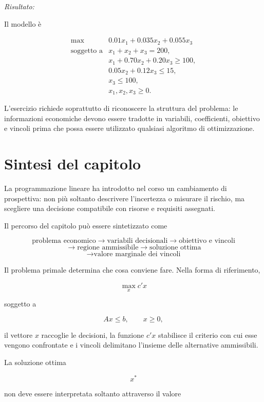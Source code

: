 \noindent
\textit{Risultato:}

Il modello \`e

\[
\begin{array}{ll}
\max
&
0.01x_1+0.035x_2+0.055x_3
\\[4pt]
\mbox{soggetto a}
&
x_1+x_2+x_3=200,
\\
&
x_1+0.70x_2+0.20x_3\geq100,
\\
&
0.05x_2+0.12x_3\leq15,
\\
&
x_3\leq100,
\\
&
x_1,x_2,x_3\geq0.
\end{array}
\]

L'esercizio richiede soprattutto di riconoscere la struttura del problema:
le informazioni economiche devono essere tradotte in variabili, coefficienti,
obiettivo e vincoli prima che possa essere utilizzato qualsiasi algoritmo di
ottimizzazione.

\section{Sintesi del capitolo}

\label{sec:cap11-sintesi}

La programmazione lineare ha introdotto nel corso un cambiamento di prospettiva:
non pi\`u soltanto descrivere l'incertezza o misurare il rischio, ma scegliere
una decisione compatibile con risorse e requisiti assegnati.

Il percorso del capitolo pu\`o essere sintetizzato come

\[
\text{problema economico}
\rightarrow
\text{variabili decisionali}
\rightarrow
\text{obiettivo e vincoli}
\]
\[
\rightarrow
\text{regione ammissibile}
\rightarrow
\text{soluzione ottima}
\]
\[
\rightarrow
\text{valore marginale dei vincoli}
\]

Il problema primale determina che cosa conviene fare. Nella forma di
riferimento,

\[
\max_x c'x
\]

\noindent soggetto a

\[
Ax\leq b,
\qquad
x\geq0,
\]

\noindent il vettore \(x\) raccoglie le decisioni, la funzione \(c'x\) stabilisce il
criterio con cui esse vengono confrontate e i vincoli delimitano l'insieme
delle alternative ammissibili.

La soluzione ottima

\[
x^*
\]

\noindent non deve essere interpretata soltanto attraverso il valore

